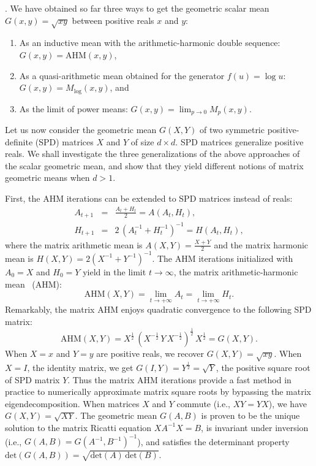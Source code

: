 \documentclass{article}
\def\det{\mathrm{det}}
\def\AHM{\mathrm{AHM}}
\begin{document}
\vskip 0.3cm
.
We have obtained so far three ways to get the geometric scalar mean $G(x,y)=\sqrt{xy}$ between positive reals $x$ and $y$:
\begin{enumerate}
	\item As an inductive mean with the arithmetic-harmonic double sequence: $G(x,y)=\AHM(x,y)$,
		\item As a quasi-arithmetic mean obtained for the generator $f(u)=\log u$: $G(x,y)=M_{\log}(x,y)$, and
	\item As the limit of power means: $G(x,y)=\lim_{p\rightarrow 0} M_p(x,y)$.
\end{enumerate}

Let us now consider the geometric mean $G(X,Y)$ of two symmetric positive-definite (SPD) matrices $X$ and $Y$ of size $d\times d$.
SPD matrices generalize positive reals.
We shall investigate the three generalizations of the above approaches of the scalar geometric mean, and show that they yield different notions of matrix geometric means when $d>1$. 


First, the AHM iterations can be extended to SPD matrices instead of reals:
\begin{eqnarray*}
A_{t+1} &=& \frac{A_t+H_t}{2}=A(A_t,H_t),\\
H_{t+1} &=& 2\, (A_t^{-1}+H_t^{-1})^{-1}=H(A_t,H_t),
\end{eqnarray*}
where the matrix arithmetic mean is $A(X,Y)=\frac{X+Y}{2}$ and the matrix harmonic mean is $H(X,Y)=2(X^{-1}+Y^{-1})^{-1}$.
The AHM iterations initialized with $A_0=X$ and $H_0=Y$ yield in the limit $t \rightarrow\infty$, the matrix arithmetic-harmonic mean~\cite{AHM-Nakamura-2001,ConvexFunctionalMean-2001} (AHM):
$$
\AHM(X,Y)=\lim_{t\rightarrow +\infty} A_t=\lim_{t\rightarrow +\infty} H_t.
$$
Remarkably, the matrix AHM enjoys quadratic convergence to the following SPD matrix:
$$
\AHM(X,Y)=X^{\frac{1}{2}}\, (X^{-\frac{1}{2}}\, Y\, X^{-\frac{1}{2}})^{\frac{1}{2}}\, X^{\frac{1}{2}}=G(X,Y).
$$
When $X=x$ and $Y=y$ are positive reals, we recover $G(X,Y)=\sqrt{xy}$.
When $X=I$, the identity matrix, we get $G(I,Y)=Y^{\frac{1}{2}}=\sqrt{Y}$, the positive square root of SPD matrix $Y$.
Thus the matrix AHM iterations provide a fast method in practice to numerically approximate matrix square roots by bypassing the matrix eigendecomposition.
When matrices $X$ and $Y$ commute (i.e., $XY=YX$), we have $G(X,Y)=\sqrt{XY}$.
The geometric mean $G(A,B)$ is proven to be the unique solution to the matrix Ricatti equation $XA^{-1}X=B$,
is invariant under inversion (i.e., $G(A,B)=G(A^{-1},B^{-1})^{-1}$), and satisfies the determinant property $\det(G(A,B))=\sqrt{\det(A)\,\det(B)}$.
\end{document}
